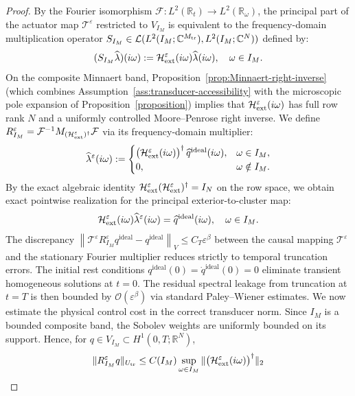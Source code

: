 \documentclass[11pt,a4paper]{article}
\numberwithin{equation}{section}
\newcommand{\R}{\mathbb{R}}
\newcommand{\C}{\mathbb{C}}
\newcommand{\veps}{\varepsilon}
\newcommand{\eps}{\varepsilon}
\newcommand{\norm}[1]{\left\lVert #1 \right\rVert}
\begin{document}
\begin{proof}
By the Fourier isomorphism $\mathcal{F}: L^2(\R_t) \to L^2(\R_\omega)$, the principal part of the actuator map $\mathcal{T}^\eps$
\newline
restricted to $V_{I_M}$ is equivalent to the frequency-domain multiplication operator 
\newline
$S_{I_M} \in \mathcal{L}(L^2(I_M; \C^{M_{\rm tr}}), L^2(I_M; \C^N))$ defined by:
\[
 (S_{I_M}\widehat \lambda)(i\omega) := \mathcal H_{\rm ext}^\varepsilon(i\omega)\widehat \lambda(i\omega), \quad \omega\in I_M.
\]
On the composite Minnaert band, Proposition~\ref{prop:Minnaert-right-inverse} (which combines Assumption~\ref{ass:transducer-accessibility} with the microscopic pole expansion of Proposition~\ref{proposition}) implies that $\mathcal H_{\rm ext}^\varepsilon(i\omega)$ has full row rank $N$ and a uniformly controlled Moore--Penrose right inverse. We define $R_{I_M}^\eps = \mathcal{F}^{-1} M_{(\mathcal H_{\rm ext}^\varepsilon)^\dagger} \mathcal{F}$ via its frequency-domain multiplier:
\[
\widehat \lambda^\eps(i\omega) := 
\begin{cases} 
\bigl(\mathcal H_{\rm ext}^\varepsilon(i\omega)\bigr)^\dagger\,\widehat q^{\mathrm{ideal}}(i\omega), & \omega\in I_M, \\ 
0, & \omega\notin I_M. 
\end{cases}
\]
By the exact algebraic identity $\mathcal H_{\rm ext}^\varepsilon(\mathcal H_{\rm ext}^\varepsilon)^\dagger = I_N$ on the row space, we obtain exact pointwise realization for the principal exterior-to-cluster map:
\[
 \mathcal H_{\rm ext}^\varepsilon(i\omega)\widehat \lambda^\eps(i\omega) 
 = \widehat q^{\mathrm{ideal}}(i\omega), \quad \omega\in I_M.
\]
The discrepancy $\norm{\mathcal{T}^\veps R_{I_M}^\veps q^{\mathrm{ideal}} - q^{\mathrm{ideal}}}_{V} \le C_T\veps^\beta$ between the causal mapping $\mathcal{T}^\veps$ and the stationary Fourier multiplier reduces strictly to temporal truncation errors. The initial rest conditions $q^{\mathrm{ideal}}(0)=\dot{q}^{\mathrm{ideal}}(0)=0$ eliminate transient homogeneous solutions at $t=0$. The residual spectral leakage from truncation at $t=T$ is then bounded by $\mathcal{O}(\veps^\beta)$ via standard Paley--Wiener estimates.
\newline
We now estimate the physical control cost in the correct transducer norm. Since $I_M$ is a bounded composite band, the Sobolev weights are uniformly bounded on its support. Hence, for $q\in V_{I_M}\subset H^1(0,T;\R^N)$,
\[
 \|R_{I_M}^\eps q\|_{U_{\rm tr}}
 \le C(I_M)\sup_{\omega\in I_M}\|\bigl(\mathcal H_{\rm ext}^\varepsilon(i\omega)\bigr)^\dagger\|_2
\]
\end{proof}
\end{document}
